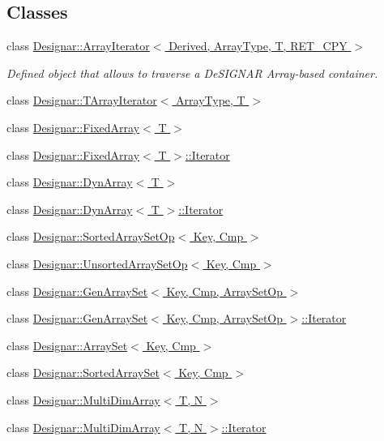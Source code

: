 \subsection*{Classes}
\begin{DoxyCompactItemize}
\item 
class \hyperlink{class_designar_1_1_array_iterator}{Designar\+::\+Array\+Iterator$<$ Derived, Array\+Type, T, R\+E\+T\+\_\+\+C\+P\+Y $>$}
\begin{DoxyCompactList}\small\item\em Defined object that allows to traverse a De\+S\+I\+G\+N\+AR Array-\/based container. \end{DoxyCompactList}\item 
class \hyperlink{class_designar_1_1_t_array_iterator}{Designar\+::\+T\+Array\+Iterator$<$ Array\+Type, T $>$}
\item 
class \hyperlink{class_designar_1_1_fixed_array}{Designar\+::\+Fixed\+Array$<$ T $>$}
\item 
class \hyperlink{class_designar_1_1_fixed_array_1_1_iterator}{Designar\+::\+Fixed\+Array$<$ T $>$\+::\+Iterator}
\item 
class \hyperlink{class_designar_1_1_dyn_array}{Designar\+::\+Dyn\+Array$<$ T $>$}
\item 
class \hyperlink{class_designar_1_1_dyn_array_1_1_iterator}{Designar\+::\+Dyn\+Array$<$ T $>$\+::\+Iterator}
\item 
class \hyperlink{class_designar_1_1_sorted_array_set_op}{Designar\+::\+Sorted\+Array\+Set\+Op$<$ Key, Cmp $>$}
\item 
class \hyperlink{class_designar_1_1_unsorted_array_set_op}{Designar\+::\+Unsorted\+Array\+Set\+Op$<$ Key, Cmp $>$}
\item 
class \hyperlink{class_designar_1_1_gen_array_set}{Designar\+::\+Gen\+Array\+Set$<$ Key, Cmp, Array\+Set\+Op $>$}
\item 
class \hyperlink{class_designar_1_1_gen_array_set_1_1_iterator}{Designar\+::\+Gen\+Array\+Set$<$ Key, Cmp, Array\+Set\+Op $>$\+::\+Iterator}
\item 
class \hyperlink{class_designar_1_1_array_set}{Designar\+::\+Array\+Set$<$ Key, Cmp $>$}
\item 
class \hyperlink{class_designar_1_1_sorted_array_set}{Designar\+::\+Sorted\+Array\+Set$<$ Key, Cmp $>$}
\item 
class \hyperlink{class_designar_1_1_multi_dim_array}{Designar\+::\+Multi\+Dim\+Array$<$ T, N $>$}
\item 
class \hyperlink{class_designar_1_1_multi_dim_array_1_1_iterator}{Designar\+::\+Multi\+Dim\+Array$<$ T, N $>$\+::\+Iterator}
\end{DoxyCompactItemize}
